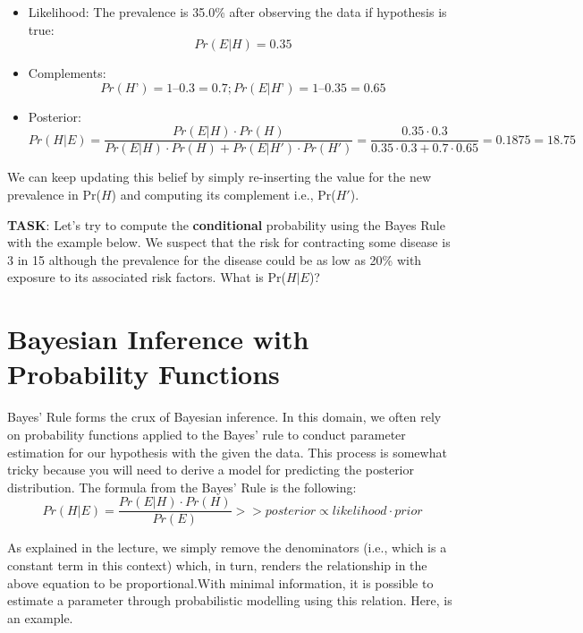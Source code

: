 \documentclass[
]{book}
\providecommand{\tightlist}{%
  \setlength{\itemsep}{0pt}\setlength{\parskip}{0pt}}
\begin{document}
\begin{itemize}
\tightlist
\item
  Likelihood: The prevalence is 35.0\% after observing the data if hypothesis is true: \[Pr(E | H) = 0.35\]
\end{itemize}

\begin{itemize}
\tightlist
\item
  Complements: \[Pr(H’) = 1 – 0.3 = 0.7; Pr(E | H’) = 1 – 0.35 = 0.65\]
\end{itemize}

\begin{itemize}
\tightlist
\item
  Posterior: \[Pr(H | E) = \frac{Pr(E|H)\cdot Pr(H)}{Pr(E|H) \cdot Pr(H) + Pr(E|H') \cdot Pr(H')} = \frac{0.35\cdot 0.3}{0.35 \cdot 0.3 + 0.7 \cdot 0.65} = 0.1875 = 18.75%
  \]
\end{itemize}

We can keep updating this belief by simply re-inserting the value for the new prevalence in Pr(\(H\)) and computing its complement i.e., Pr(\(H'\)).

\textbf{TASK}: Let's try to compute the \textbf{conditional} probability using the Bayes Rule with the example below. We suspect that the risk for contracting some disease is 3 in 15 although the prevalence for the disease could be as low as 20\% with exposure to its associated risk factors. What is Pr(\(H|E\))?

\hypertarget{bayesian-inference-with-probability-functions}{%
\section{Bayesian Inference with Probability Functions}\label{bayesian-inference-with-probability-functions}}

Bayes' Rule forms the crux of Bayesian inference. In this domain, we often rely on probability functions applied to the Bayes' rule to conduct parameter estimation for our hypothesis with the given the data. This process is somewhat tricky because you will need to derive a model for predicting the posterior distribution. The formula from the Bayes' Rule is the following: \[Pr(H | E) = \frac{Pr(E|H)\cdot Pr(H)}{Pr(E)} >> posterior \propto likelihood \cdot prior\]

As explained in the lecture, we simply remove the denominators (i.e., which is a constant term in this context) which, in turn, renders the relationship in the above equation to be proportional.With minimal information, it is possible to estimate a parameter through probabilistic modelling using this relation. Here, is an example.
\end{document}
